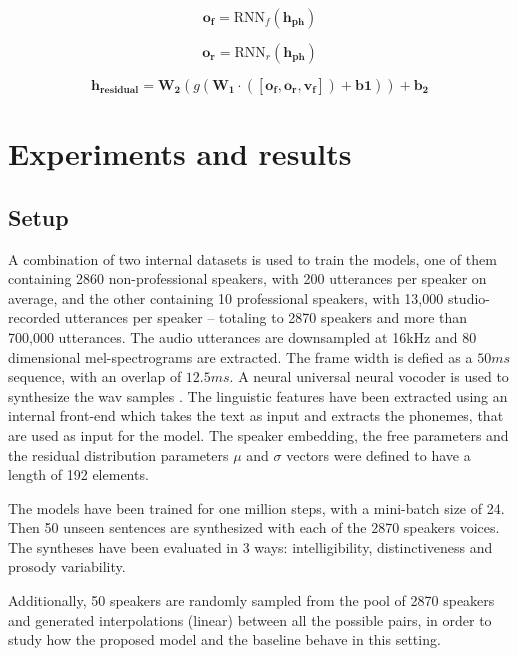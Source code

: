 \begin{equation}
 \label{eq:rnn1}
\mathbf{o_f} = \text{RNN}_f(\mathbf{h_{ph}})
\end{equation}

\begin{equation}
 \label{eq:rnn2}
\mathbf{o_r} = \text{RNN}_r(\mathbf{h_{ph}})
\end{equation}

\begin{equation}
 \label{eq:residual}
\mathbf{h_{residual}} = \mathbf{W_2}(g(\mathbf{W_1}\cdot([\mathbf{o_f}, \mathbf{o_r}, \mathbf{v_f}]) + \mathbf{b1} )) +\mathbf{ b_2}
\end{equation}

\section{Experiments and results}
\subsection{Setup}
 A combination of two internal datasets is used to train the models, one of them containing 2860 non-professional speakers, with 200 utterances per speaker on average, and the other containing 10 professional speakers, with 13,000 studio-recorded utterances per speaker – totaling to 2870 speakers and more than 700,000 utterances. The audio utterances are downsampled at 16kHz and 80 dimensional mel-spectrograms are extracted. The frame width is defied as a $50ms$ sequence, with an overlap of $12.5ms$. A neural universal neural vocoder is used to synthesize the wav samples \autocite{lorenzotrueba2019}. The linguistic features have been extracted using an internal front-end which takes the text as input and extracts the phonemes, that are used as input for the model. The speaker embedding, the free parameters and the residual distribution parameters $\mu$ and $\sigma$ vectors were defined to have a length of 192 elements.

 The models have been trained for one million steps, with a mini-batch size of 24. Then 50 unseen sentences are synthesized with each of the 2870 speakers voices. The syntheses have been evaluated in 3 ways: intelligibility, distinctiveness and prosody variability.

 Additionally, 50 speakers are randomly sampled from the pool of 2870 speakers and generated interpolations (linear) between all the possible pairs, in order to study how the proposed model and the baseline behave in this setting.

